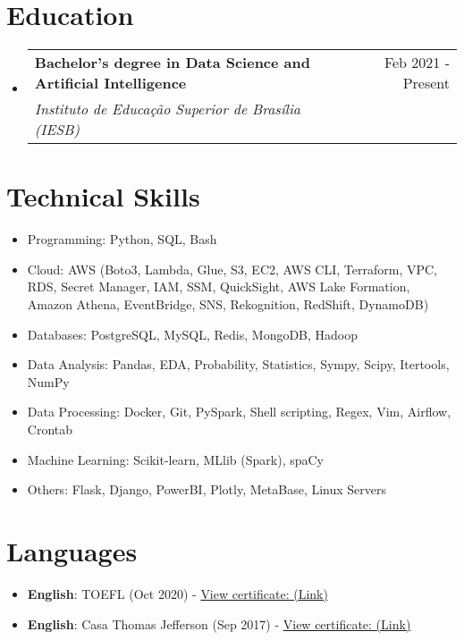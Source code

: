 \documentclass[letterpaper,11pt]{article}%
\makeatletter
\newcommand{\resumeSubheading}[4]{\vspace{-1pt}\item\begin{tabular*}{0.97\textwidth}[t]{l@{\extracolsep{\fill}}r}\textbf{#1} & #2 \\\textit{\small #3} & \textit{\small #4} \\\end{tabular*}\vspace{-8pt}}%
\newcommand{\resumeSubHeadingListStart}{\begin{itemize}[leftmargin=0.15in, label={}, itemsep=0pt, parsep=0pt]}%
\newcommand{\resumeSubHeadingListEnd}{\end{itemize}}%
\newcommand{\resumeItemListStart}{\begin{itemize}[itemsep=0pt, parsep=0pt]}%
\newcommand{\resumeItemListEnd}{\end{itemize}\vspace{-1pt}}%
\makeatother
\begin{document}
%
\section*{Education}%
\label{sec:Education}%
\resumeSubHeadingListStart%
\resumeSubheading{Bachelor’s degree in Data Science and Artificial Intelligence}{Feb 2021 - Present}{Instituto de Educação Superior de Brasília (IESB)}{}%
\resumeSubHeadingListEnd

%
\section*{Technical Skills}%
\label{sec:TechnicalSkills}%
\begin{multicols}{2}%
\resumeItemListStart%
\item Programming: Python, SQL, Bash%
\item Cloud: AWS (Boto3, Lambda, Glue, S3, EC2, AWS CLI, Terraform, VPC, RDS, Secret Manager, IAM, SSM, QuickSight, AWS Lake Formation, Amazon Athena, EventBridge, SNS, Rekognition, RedShift, DynamoDB)%
\item Databases: PostgreSQL, MySQL, Redis, MongoDB, Hadoop%
\item Data Analysis: Pandas, EDA, Probability, Statistics, Sympy, Scipy, Itertools, NumPy%
\item Data Processing: Docker, Git, PySpark, Shell scripting, Regex, Vim, Airflow, Crontab%
\item Machine Learning: Scikit-learn, MLlib (Spark), spaCy%
\item Others: Flask, Django, PowerBI, Plotly, MetaBase, Linux Servers%
\resumeItemListEnd%
\end{multicols}

%
\section*{Languages}%
\label{sec:Languages}%
\begin{itemize}[leftmargin=0.15in, label={}]%
\item%
\textbf{English}: TOEFL (Oct 2020) - \href{https://github.com/s33ding/my_resume/blob/main/my_certificates/english_TOEFL_my_score.pdf}{View certificate: (Link)}%
\item%
\textbf{English}: Casa Thomas Jefferson (Sep 2017) - \href{https://github.com/s33ding/my_resume/blob/main/my_certificates/english_Casa%20Thomas%20Jefferson.pdf}{View certificate: (Link)}%
\end{itemize}

%
\end{document}
